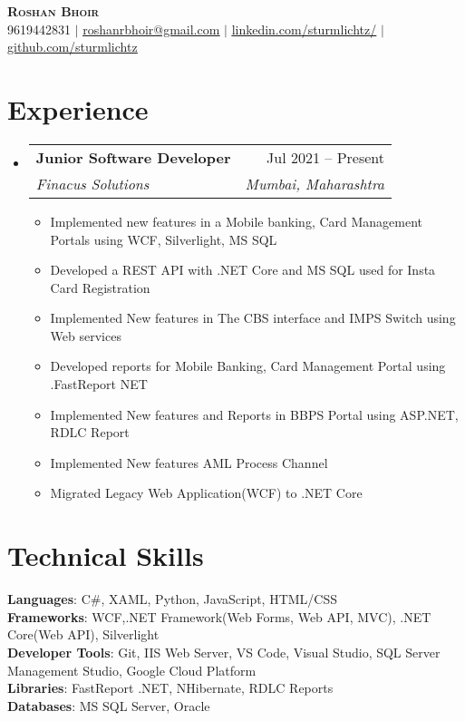 \documentclass[letterpaper,11pt]{article}
\makeatletter
\newcommand{\resumeItem}[1]{
  \item\small{
    {#1 \vspace{-2pt}}
  }
}
\newcommand{\resumeSubheading}[4]{
  \vspace{-2pt}\item
    \begin{tabular*}{0.97\textwidth}[t]{l@{\extracolsep{\fill}}r}
      \textbf{#1} & #2 \\
      \textit{\small#3} & \textit{\small #4} \\
    \end{tabular*}\vspace{-7pt}
}
\newcommand{\resumeSubHeadingListStart}{\begin{itemize}[leftmargin=0.15in, label={}]}
\newcommand{\resumeSubHeadingListEnd}{\end{itemize}}
\newcommand{\resumeItemListStart}{\begin{itemize}}
\newcommand{\resumeItemListEnd}{\end{itemize}\vspace{-5pt}}
\makeatother
\begin{document}
\begin{center}
    \textbf{\Huge \scshape Roshan Bhoir} \\ \vspace{1pt}
    \small 9619442831 $|$ \href{mailto:roshanrbhoir@gmail.com}{\underline{roshanrbhoir@gmail.com}} $|$ 
    \href{https://linkedin.com/in/sturmlichtz}{\underline{linkedin.com/sturmlichtz/}} $|$
    \href{https://github.com/sturmlichtz}{\underline{github.com/sturmlichtz}}
\end{center}
\section{Experience}
  \resumeSubHeadingListStart
    \resumeSubheading
      {Junior Software Developer}{Jul 2021 -- Present}
      {Finacus Solutions}{Mumbai, Maharashtra}
      \resumeItemListStart
        \resumeItem{Implemented new features in a Mobile banking, Card Management Portals using WCF, Silverlight, MS SQL }
        \resumeItem{Developed a REST API with .NET Core and MS SQL used for Insta Card Registration}
        \resumeItem{Implemented New features in The CBS interface and IMPS Switch using Web services }
        \resumeItem{Developed reports for Mobile Banking, Card Management Portal using .FastReport NET}
        \resumeItem{Implemented New features and Reports in BBPS Portal using ASP.NET, RDLC Report}
        \resumeItem{Implemented New features AML Process Channel}
        \resumeItem{Migrated Legacy Web Application(WCF) to .NET Core}
      \resumeItemListEnd
  \resumeSubHeadingListEnd

\section{Technical Skills}
\begin{itemize}[leftmargin=0.15in, label={}]
    \small{\item{
     \textbf{Languages}{: C\#, XAML, Python, JavaScript, HTML/CSS} \\
     \textbf{Frameworks}{: WCF,.NET Framework(Web Forms, Web API, MVC), .NET Core(Web API), Silverlight} \\
     \textbf{Developer Tools}{: Git, IIS Web Server, VS Code, Visual Studio, SQL Server Management Studio, Google Cloud Platform} \\
     \textbf{Libraries}{: FastReport .NET, NHibernate, RDLC Reports}\\
     \textbf{Databases}{: MS SQL Server, Oracle} \\
    }}
 \end{itemize}
\end{document}
